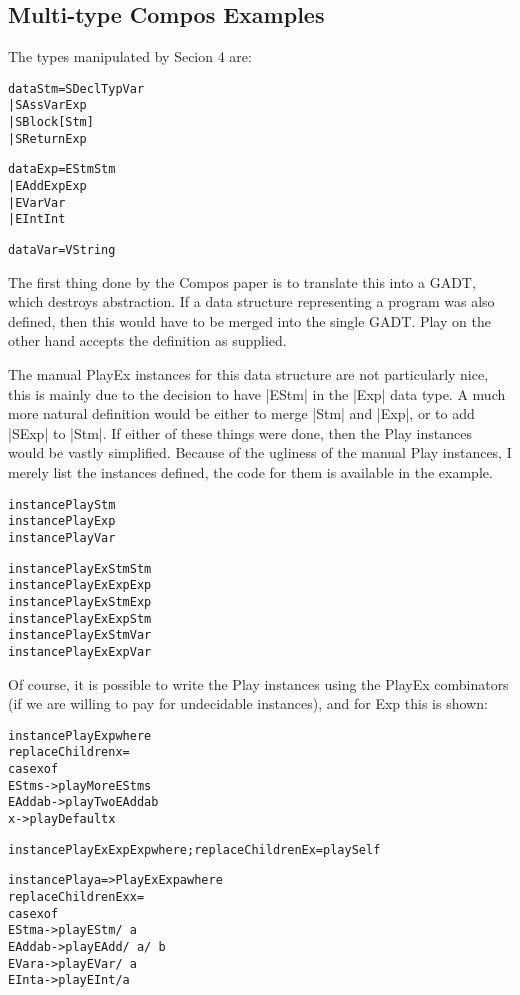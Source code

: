 \documentclass[preprint]{sigplanconf}
\newenvironment{code}{\begin{alltt}\small}{\end{alltt}}
\begin{document}
\subsection{Multi-type Compos Examples}



    The types manipulated by Secion 4 are:

\begin{code}
data Stm = SDecl Typ Var
         | SAss  Var Exp
         | SBlock [Stm]
         | SReturn Exp

data Exp = EStm Stm
         | EAdd Exp Exp
         | EVar Var
         | EInt Int

data Var = V String

\end{code}

    The first thing done by the Compos paper is to translate this into a GADT, which destroys abstraction. If a data structure representing a program was also defined, then this would have to be merged into the single GADT. Play on the other hand accepts the definition as supplied.


    The manual PlayEx instances for this data structure are not particularly nice, this is mainly due to the decision to have |EStm| in the |Exp| data type. A much more natural definition would be either to merge |Stm| and |Exp|, or to add |SExp| to |Stm|. If either of these things were done, then the Play instances would be vastly simplified. Because of the ugliness of the manual Play instances, I merely list the instances defined, the code for them is available in the example.

\begin{code}
instance Play Stm
instance Play Exp
instance Play Var

instance PlayEx Stm Stm
instance PlayEx Exp Exp
instance PlayEx Stm Exp
instance PlayEx Exp Stm
instance PlayEx Stm Var
instance PlayEx Exp Var
\end{code}

    Of course, it is possible to write the Play instances using the PlayEx combinators (if we are willing to pay for undecidable instances), and for Exp this is shown:

\begin{code}
instance Play Exp where
    replaceChildren x =
        case x of
            EStm s -> playMore EStm s
            EAdd a b -> playTwo EAdd a b
            x -> playDefault x

instance PlayEx Exp Exp where; replaceChildrenEx = playSelf

instance Play a => PlayEx Exp a where
    replaceChildrenEx x =
        case x of
            EStm a -> play EStm /\ a
            EAdd a b -> play EAdd /\ a /\ b
            EVar a -> play EVar /\ a
            EInt a -> play EInt /\! a
\end{code}
\end{document}
